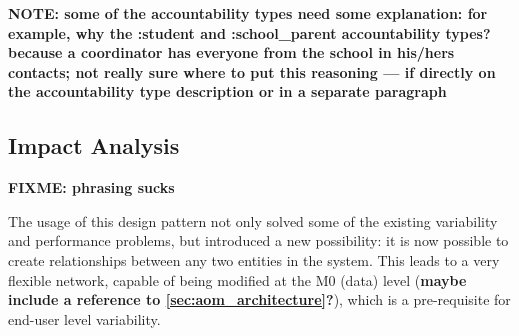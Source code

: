 
\textbf{NOTE: some of the accountability types need some explanation: for example, why the :student and :school\_parent accountability types? because a coordinator has everyone from the school in his/hers contacts; not really sure where to put this reasoning --- if directly on the accountability type description or in a separate paragraph}

\subsection{Impact Analysis}\label{sec:fa_social_network_impact_analysis}

\textbf{FIXME: phrasing sucks}

The usage of this design pattern not only solved some of the existing variability and performance problems, but introduced a new possibility: it is now possible to create relationships between any two entities in the system. This leads to a very flexible network, capable of being modified at the M0 (data) level (\textbf{maybe include a reference to \ref{sec:aom_architecture}?}), which is a pre-requisite for end-user level variability.





